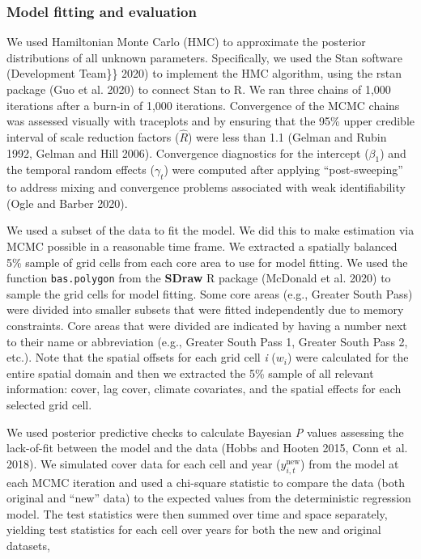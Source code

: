 \documentclass[
  12pt,
]{article}
\begin{document}
\hypertarget{model-fitting-and-evaluation}{%
\subsubsection{Model fitting and evaluation}\label{model-fitting-and-evaluation}}

We used Hamiltonian Monte Carlo (HMC) to approximate the posterior distributions of all unknown parameters.
Specifically, we used the Stan software (Development Team\}\} 2020) to implement the HMC algorithm, using the rstan package (Guo et al. 2020) to connect Stan to R.
We ran three chains of 1,000 iterations after a burn-in of 1,000 iterations.
Convergence of the MCMC chains was assessed visually with traceplots and by ensuring that the 95\% upper credible interval of scale reduction factors (\(\hat{R}\)) were less than 1.1 (Gelman and Rubin 1992, Gelman and Hill 2006).
Convergence diagnostics for the intercept (\(\beta_1\)) and the temporal random effects (\(\gamma_t\)) were computed after applying ``post-sweeping'' to address mixing and convergence problems associated with weak identifiability (Ogle and Barber 2020).

We used a subset of the data to fit the model.
We did this to make estimation via MCMC possible in a reasonable time frame.
We extracted a spatially balanced 5\% sample of grid cells from each core area to use for model fitting.
We used the function \texttt{bas.polygon} from the \textbf{SDraw} R package (McDonald et al. 2020) to sample the grid cells for model fitting.
Some core areas (e.g., Greater South Pass) were divided into smaller subsets that were fitted independently due to memory constraints.
Core areas that were divided are indicated by having a number next to their name or abbreviation (e.g., Greater South Pass 1, Greater South Pass 2, etc.).
Note that the spatial offsets for each grid cell \emph{i} (\(w_i\)) were calculated for the entire spatial domain and then we extracted the 5\% sample of all relevant information: cover, lag cover, climate covariates, and the spatial effects for each selected grid cell.

We used posterior predictive checks to calculate Bayesian \emph{P} values assessing the lack-of-fit between the model and the data (Hobbs and Hooten 2015, Conn et al. 2018).
We simulated cover data for each cell and year (\(y^{\text{new}}_{i,t}\)) from the model at each MCMC iteration and used a chi-square statistic to compare the data (both original and ``new'' data) to the expected values from the deterministic regression model.
The test statistics were then summed over time and space separately, yielding test statistics for each cell over years for both the new and original datasets,
\end{document}
